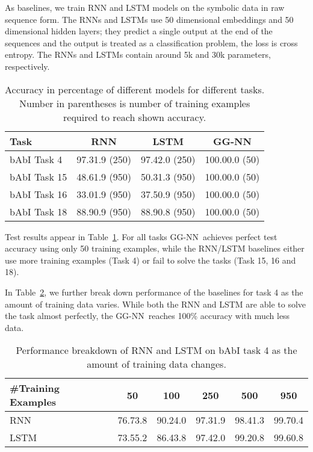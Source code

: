 \documentclass{article} \usepackage{iclr2016_conference,times}
\newcommand{\OurMethodMinorShort}{GG-NN}
\begin{document}
As baselines, we train RNN and LSTM models on the symbolic
data in raw sequence form. The RNNs and LSTMs use 50 dimensional
embeddings and 50 dimensional hidden layers; they predict a single
output at the end of the sequences and the output is treated as a
classification problem, the loss is cross entropy. The RNNs and LSTMs contain
around 5k and 30k parameters, respectively.

\begin{table}[h]
  \centering
\begin{tabular}{@{}lccc@{}}
        \toprule
        Task    & RNN   & LSTM  & \OurMethodMinorShort \\
        \midrule
        bAbI Task \phantom{1}4 & 97.31.9 (250) & 97.42.0 (250) &
        100.00.0 (50) \\
        bAbI Task 15 & 48.61.9 (950) & 50.31.3 (950) & 100.00.0 (50) \\
        bAbI Task 16 & 33.01.9 (950) & 37.50.9 (950) & 100.00.0 (50) \\
        bAbI Task 18 & 88.90.9 (950) & 88.90.8 (950) & 100.00.0 (50) \\
        \bottomrule
    \end{tabular}
\caption{Accuracy in percentage of different models for different tasks.
    Number in parentheses is number of training examples required to reach shown
    accuracy.}
  \label{table:single-step-babi}
\end{table}
Test results appear in Table~\ref{table:single-step-babi}. For all tasks
\OurMethodMinorShort~achieves perfect test accuracy using only 50 training
examples, while the RNN/LSTM baselines either use more training examples (Task
4) or fail to solve the tasks (Task 15, 16 and 18).

In Table~\ref{table:task4-breakdown}, we further break down performance of the baselines for task 4 as the amount
of training data varies. While both the RNN and LSTM are able to solve the task
almost perfectly, the \OurMethodMinorShort~reaches 100\% accuracy with much less
data.

\begin{table}[ht]
    \centering
    \begin{tabular}{@{}lccccc@{}}
        \toprule
        \#Training Examples    & 50    & 100   & 250   & 500   & 950 \\
        \midrule
        RNN  & 76.73.8 & 90.24.0 & 97.31.9 & 98.41.3 & 99.70.4 \\
        LSTM & 73.55.2 & 86.43.8 & 97.42.0 & 99.20.8 & 99.60.8 \\
        \bottomrule
    \end{tabular}
    \caption{Performance breakdown of RNN and LSTM on bAbI task 4 as the
    amount of training data changes.}
  \label{table:task4-breakdown}
\end{table}
\end{document}
